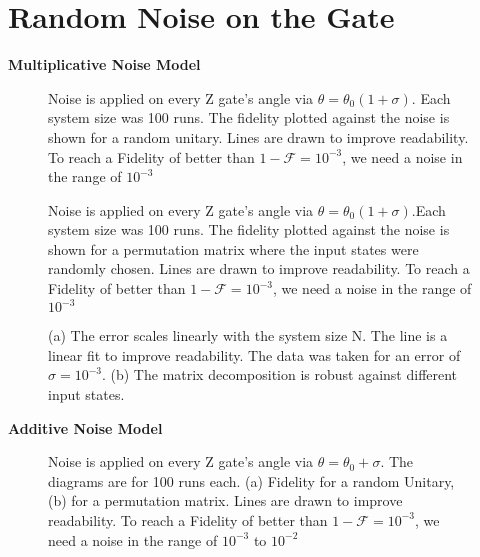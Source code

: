 \section{Random Noise on the Gate}

\textbf{Multiplicative Noise Model}
\begin{figure}[htb]
  \centering
  \caption[Multiplicative Noise Model for DFT]{Noise is applied on every Z gate's angle via $\theta=\theta_0(1+\sigma)$. Each system size was 100 runs. The fidelity plotted against the noise is shown for a random unitary. Lines are drawn to improve readability. To reach a Fidelity of better than $1-\mathcal{F} = 10^{-3}$, we need a noise in the range of $10^{-3}$}
  \label{fig:multnoise}
\end{figure}

\begin{figure}[htb]
  \centering
  \caption[Multiplicative Noise Model for permutation matrix]{Noise is applied on every Z gate's angle via $\theta=\theta_0(1+\sigma)$.Each system size was 100 runs. The fidelity plotted against the noise is shown for a permutation matrix where the input states were randomly chosen. Lines are drawn to improve readability. To reach a Fidelity of better than $1-\mathcal{F} = 10^{-3}$, we need a noise in the range of $10^{-3}$}
  \label{fig:multnoise}
\end{figure}

\begin{figure}[t]
    \centering
    \caption[Fidelity plotted against the System Size]{(a) The error scales linearly with the system size N. The line is a linear fit to improve readability. The data was taken for an error of $\sigma=10^{-3}$. (b) The matrix decomposition is robust against different input states.}
    \label{fig:multvsN}
\end{figure}

\textbf{Additive Noise Model}
\begin{figure}[htb]
  \centering
  \begin{subfigure}[t]{0.49\linewidth}
    \label{fig:mult1}
  \end{subfigure}
  \hfill
  \begin{subfigure}[t]{0.49\linewidth}
    \label{fig:mult2}
  \end{subfigure}
 \caption[Additive Noise Error Model for DFT and permutation]{Noise is applied on every Z gate's angle via $\theta=\theta_0 + \sigma$. The diagrams are for 100 runs each. (a) Fidelity for a random Unitary, (b) for a permutation matrix. Lines are drawn to improve readability. To reach a Fidelity of better than $1-\mathcal{F} = 10^{-3}$, we need a noise in the range of $10^{-3}$ to $10^{-2}$}
  \label{fig:multnoise}
\end{figure}

